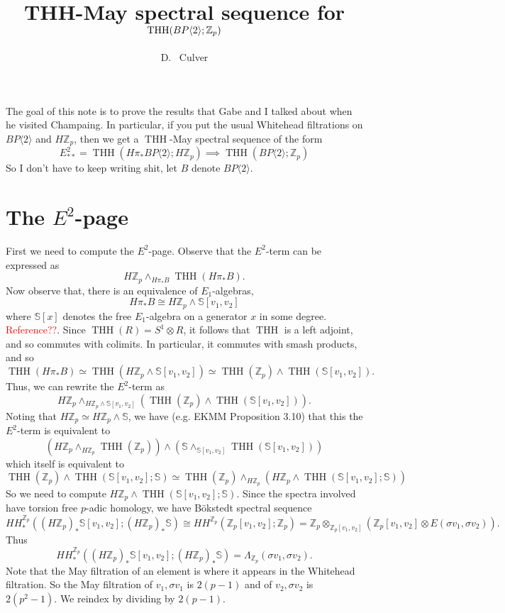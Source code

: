 \documentclass[12pt]{amsart}
\title{THH-May spectral sequence for $\THH(\tBP{2}; \Z_p)$}
\author{D.~ Culver}\address{University of Illinois, Urbana-Champaign}\email{dculver@illinois.edu}
\newcommand{\bra}[1]{\langle #1 \rangle}
\newcommand{\Z}{\mathbb{Z}}
\newcommand{\bbS}{\mathbb{S}}
\newcommand{\tBP}[1]{BP\bra{#1}}
\DeclareMathOperator{\THH}{THH}
\theoremstyle{definition}
\numberwithin{equation}{section}
\numberwithin{figure}{section}
\begin{document}
\maketitle

\tableofcontents

The goal of this note is to prove the results that Gabe and I talked about when he visited Champaing. In particular, if you put the usual Whitehead filtrations on $\tBP{2}$ and $H\Z_p$, then we get a $\THH$-May spectral sequence of the form 
\[
E^2_{**} = \THH(H\pi_*\tBP{2}; H\Z_{p})\implies \THH(\tBP{2}; \Z_p)
\]
So I don't have to keep writing shit, let $B$ denote $\tBP{2}$.


\section{The $E^2$-page}

First we need to compute the $E^2$-page. Observe that the $E^2$-term can be expressed as 
\[
H\Z_p\wedge_{H\pi_*B}\THH(H\pi_*B).
\]
Now observe that, there is an equivalence of $E_1$-algebras, 
\[
H\pi_*B\cong H\Z_p\wedge \bbS[v_1,v_2]
\]
where $\bbS[x]$ denotes the free $E_1$-algebra on a generator $x$ in some degree. \textcolor{red}{Reference??}. Since $\THH(R) = S^1\otimes R$, it follows that $\THH$ is a left adjoint, and so commutes with colimits. In particular, it commutes with smash products, and so 
\[
\THH(H\pi_*B) \simeq  \THH(H\Z_p\wedge \bbS[v_1,v_2])\simeq \THH(\Z_p)\wedge \THH(\bbS[v_1,v_2]).
\]
Thus, we can rewrite the $E^2$-term as 
\[
H\Z_p\wedge_{H\Z_p\wedge \bbS[v_1,v_2]}\left(\THH(\Z_p)\wedge \THH(\bbS[v_1,v_2])\right).
\]
Noting that $H\Z_p\simeq H\Z_p\wedge \bbS$, we have (e.g. EKMM Proposition 3.10) that this the $E^2$-term is equivalent to 
\[
(H\Z_p\wedge_{H\Z_p} \THH(\Z_p))\wedge (\bbS\wedge_{\bbS[v_1,v_2]}\THH(\bbS[v_1,v_2]))
\]
which itself is equivalent to 
\[
\THH(\Z_p)\wedge \THH(\bbS[v_1,v_2];\bbS)\simeq \THH(\Z_p)\wedge_{H\Z_p}(H\Z_p\wedge \THH(\bbS[v_1,v_2];\bbS))
\]
So we need to compute $H\Z_p \wedge \THH(\bbS[v_1,v_2];\bbS)$. Since the spectra involved have torsion free $p$-adic homology, we have B\"okstedt spectral sequence
\[
HH^{\Z_p}_*((H\Z_p)_*\bbS[v_1,v_2]; (H\Z_p)_*\bbS)\cong HH^{\Z_p}(\Z_p[v_1,v_2]; \Z_p) = \Z_p\otimes_{\Z_p[v_1,v_2]}(\Z_p[v_1,v_2]\otimes E(\sigma v_1, \sigma v_2)).
\]
Thus
\[
HH^{\Z_p}_*((H\Z_p)_*\bbS[v_1,v_2]; (H\Z_p)_*\bbS) = \Lambda_{\Z_p}(\sigma v_1, \sigma v_2).
\]
Note that the May filtration of an element is where it appears in the Whitehead filtration. So the May filtration of $v_1, \sigma v_1$ is $2(p-1)$ and of $v_2, \sigma v_2$ is $2(p^2-1)$. We reindex by dividing by $2(p-1)$. 
\end{document}
